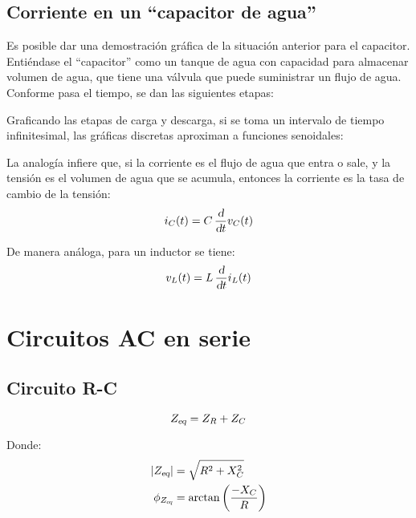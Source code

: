 \documentclass[a5paper,12pt,twoside]{book}
\begin{document}
\subsection*{Corriente en un ``capacitor de agua''}

Es posible dar una demostración gráfica de la situación anterior para el capacitor. Entiéndase el ``capacitor'' como un tanque de agua con capacidad para almacenar volumen de agua, que tiene una válvula que puede suministrar un flujo de agua. Conforme pasa el tiempo, se dan las siguientes etapas:

\begin{center}
    \def\svgwidth{\linewidth}
    
\end{center}

Graficando las etapas de carga y descarga, si se toma un intervalo de tiempo infinitesimal, las gráficas discretas aproximan a funciones senoidales:

\begin{center}
    \def\svgwidth{0.6\linewidth}
    
\end{center}

La analogía infiere que, si la corriente es el flujo de agua que entra o sale, y la tensión es el volumen de agua que se acumula, entonces la corriente es la tasa de cambio de la tensión:
\begin{equation*}
    i_C(t) = C \, \frac{\textsl{d}}{\textsl{d} t} v_C(t)
\end{equation*}

De manera análoga, para un inductor se tiene:
\begin{equation*}
    v_L(t) = L \, \frac{\textsl{d}}{\textsl{d} t} i_L(t)
\end{equation*}


\section{Circuitos AC en serie}


\subsection*{Circuito R-C}

\begin{equation*}
    {{Z}_\textsl{{eq}}} = Z_R + Z_C
\end{equation*}

Donde:
\begin{align*}
    {\left| {{{Z}_\textsl{{eq}}}} \right|} &= \sqrt{R^2 + X_C^2}
    \\
    \phi_{{{Z}_\textsl{{eq}}}} &= \arctan{\left(\dfrac{-X_C}{R}\right)}
\end{align*}
\end{document}

